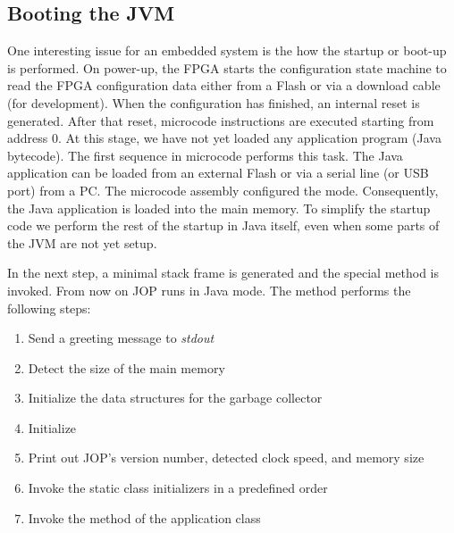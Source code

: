 \subsection{Booting the JVM}

One interesting issue for an embedded system is the how the startup
or boot-up is performed. On power-up, the FPGA starts the
configuration state machine to read the FPGA configuration data
either from a Flash or via a download cable (for development). When
the configuration has finished, an internal reset is generated. After
that reset, microcode instructions are executed starting from address
0. At this stage, we have not yet loaded any application program
(Java bytecode). The first sequence in microcode performs this task.
The Java application can be loaded from an external Flash or via a
serial line (or USB port) from a PC. The microcode assembly
configured the mode. Consequently, the Java application is loaded
into the main memory. To simplify the startup code we perform the
rest of the startup in Java itself, even when some parts of the JVM
are not yet setup.

In the next step, a minimal stack frame is generated and the special
method  is invoked. From now on JOP runs in
Java mode. The method  performs the following steps:
\begin{samepage}
\begin{enumerate}
    \item Send a greeting message to \emph{stdout}
    \item Detect the size of the main memory
    \item Initialize the data structures for the garbage collector
    \item Initialize 
    \item Print out JOP's version number, detected clock speed, and
    memory size
    \item Invoke the static class initializers in a predefined order
    \item Invoke the  method of the application class
\end{enumerate}
\end{samepage}

